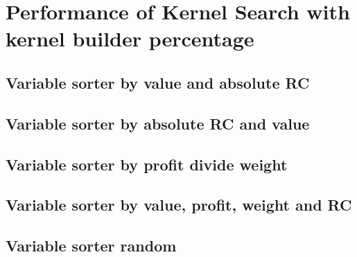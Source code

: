 \newpage
\section{Performance of Kernel Search with kernel builder percentage}\label{Instances results kernel percentage}

\newpage
\subsection{Variable sorter by value and absolute RC}


\newpage
\subsection{Variable sorter by absolute RC and value}


\newpage
\subsection{Variable sorter by profit divide weight}


\newpage
\subsection{Variable sorter by value, profit, weight and RC}


\newpage
\subsection{Variable sorter random}
